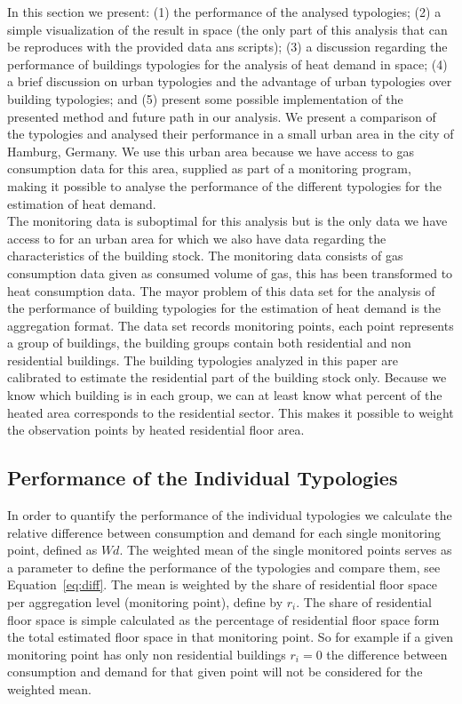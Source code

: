 In this section we present: (1) the performance of the analysed typologies; (2)
a simple visualization of the result in space (the only part of this analysis
that can be reproduces with the provided data ans scripts); (3) a discussion
regarding the performance of buildings typologies for the analysis of heat
demand in space; (4) a brief discussion on urban typologies and the advantage
of urban typologies over building typologies; and (5) present some possible
implementation of the presented method and future path in our analysis.  We
present a comparison of the typologies and analysed their performance in a
small urban area in the city of Hamburg, Germany. We use this urban area
because we have access to gas consumption data for this area, supplied as part
of a monitoring program, making it possible to analyse the performance of the
different typologies for the estimation of heat demand.\\

The monitoring data is suboptimal for this analysis but is the only data we
have access to for an urban area for which we also have data regarding the
characteristics of the building stock. The monitoring data consists of gas
consumption data given as consumed volume of gas, this has been transformed to
heat consumption data. The mayor problem of this data set for the analysis of
the performance of building typologies for the estimation of heat demand is the
aggregation format. The data set records monitoring points, each point
represents a group of buildings, the building groups contain both residential
and non residential buildings. The building typologies analyzed in this paper
are calibrated to estimate the residential part of the building stock only.
Because we know which building is in each group, we can at least know what
percent of the heated area corresponds to the residential sector. This makes it
possible to weight the observation points by heated residential floor area.\\

\subsection{Performance of the Individual Typologies}

In order to quantify the performance of the individual typologies we calculate
the relative difference between consumption and demand for each single
monitoring point, defined as $Wd$.  The weighted mean of the single monitored
points serves as a parameter to define the performance of the typologies and
compare them, see Equation~\ref{eq:diff}.  The mean is weighted by the share of
residential floor space per aggregation level (monitoring point), define by
$r_i$. The share of residential floor space is simple calculated as the
percentage of residential floor space form the total estimated floor space in
that monitoring point.  So for example if a given monitoring point has only non
residential buildings $r_i = 0$ the difference between consumption and demand
for that given point will not be considered for the weighted mean.\\

